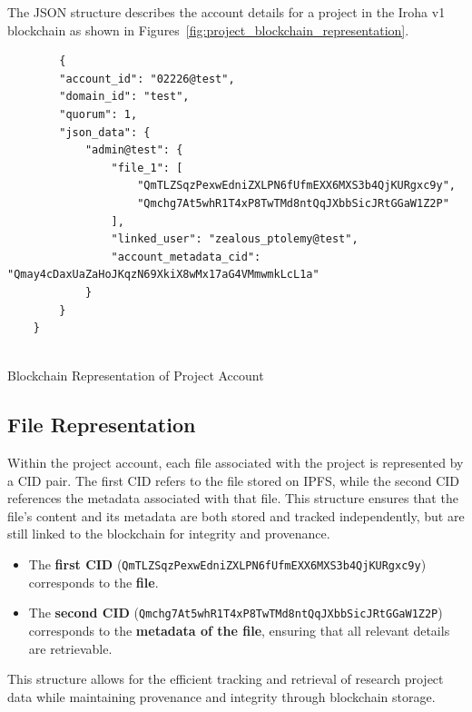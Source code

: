 \documentclass[final]{rc-book-2.14}
\begin{document}
The JSON structure describes the account details for a project in the Iroha v1 blockchain as shown in Figures~\ref{fig:project_blockchain_representation}.


\begin{listing}
    \begin{verbatim}
        {
        "account_id": "02226@test",
        "domain_id": "test",
        "quorum": 1,
        "json_data": {
            "admin@test": {
                "file_1": [
                    "QmTLZSqzPexwEdniZXLPN6fUfmEXX6MXS3b4QjKURgxc9y",
                    "Qmchg7At5whR1T4xP8TwTMd8ntQqJXbbSicJRtGGaW1Z2P"
                ],
                "linked_user": "zealous_ptolemy@test",
                "account_metadata_cid": "Qmay4cDaxUaZaHoJKqzN69XkiX8wMx17aG4VMmwmkLcL1a"
            }
        }
    }
  
\end{verbatim}
    \caption{Blockchain Representation of Project Account}
    \label{fig:project_blockchain_representation}
\end{listing}



\subsection*{File Representation}

Within the project account, each file associated with the project is represented by a CID pair. The first CID refers to the file stored on IPFS, while the second CID references the metadata associated with that file. This structure ensures that the file's content and its metadata are both stored and tracked independently, but are still linked to the blockchain for integrity and provenance.

\begin{itemize}
    \item The \textbf{first CID} (\texttt{QmTLZSqzPexwEdniZXLPN6fUfmEXX6MXS3b4QjKURgxc9y}) corresponds to the \textbf{file}.
    \item The \textbf{second CID} (\texttt{Qmchg7At5whR1T4xP8TwTMd8ntQqJXbbSicJRtGGaW1Z2P}) corresponds to the \textbf{metadata of the file}, ensuring that all relevant details are retrievable.
\end{itemize}

This structure allows for the efficient tracking and retrieval of research project data while maintaining provenance and integrity through blockchain storage.
\end{document}
